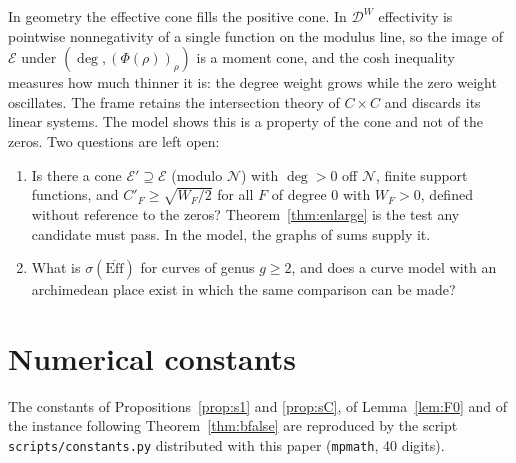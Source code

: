 \documentclass[11pt]{amsart}
\theoremstyle{definition}
\theoremstyle{remark}
\newcommand{\DW}{\mathcal D^{W}}
\newcommand{\Nr}{\mathcal N}
\newcommand{\Ef}{\mathcal E}
\newcommand{\dg}{\deg}
\begin{document}
In geometry the effective cone fills the positive cone. In $\DW$ effectivity is pointwise nonnegativity of a
single function on the modulus line, so the image of $\Ef$ under $(\dg,(\Phi(\rho))_\rho)$ is a moment cone, and
the cosh inequality measures how much thinner it is: the degree weight grows while the zero weight
oscillates. The frame retains the intersection theory of $C\times C$ and discards its linear systems.
The model shows this is a property of the cone and not of the zeros. Two questions are left open:
\begin{enumerate}
\item Is there a cone $\Ef'\supseteq\Ef$ (modulo $\Nr$) with $\dg>0$ off $\Nr$, finite support functions, and
$C'_{F}\ge\sqrt{W_F/2}$ for all $F$ of degree $0$ with $W_F>0$, defined without reference to the zeros?
Theorem~\ref{thm:enlarge} is the test any candidate must pass. In the model, the graphs of sums supply it.
\item What is $\sigma(\overline{\mathrm{Eff}})$ for curves of genus $g\ge2$, and does a curve model with an
archimedean place exist in which the same comparison can be made?
\end{enumerate}

\appendix
\section{Numerical constants}
The constants of Propositions~\ref{prop:s1} and \ref{prop:sC}, of Lemma~\ref{lem:F0} and of the instance
following Theorem~\ref{thm:bfalse} are reproduced by the script \texttt{scripts/constants.py}
distributed with this paper (\texttt{mpmath}, 40 digits).
\end{document}
